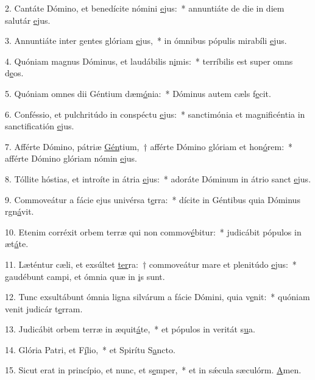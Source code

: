 2. Cantáte Dómino, et benedícite nómini \uline{e}jus:~* annuntiáte de die in diem salutár \uline{e}jus.\par 
3. Annuntiáte inter gentes glóriam \uline{e}jus,~* in ómnibus pópulis mirabíli \uline{e}jus.\par 
4. Quóniam magnus Dóminus, et laudábilis n\uline{i}mis:~* terríbilis est super omns d\uline{e}os.\par 
5. Quóniam omnes dii Géntium dæm\uline{ó}nia:~* Dóminus autem cæls f\uline{e}cit.\par 
6. Conféssio, et pulchritúdo in conspéctu \uline{e}jus:~* sanctimónia et magnificéntia in sanctificatión \uline{e}jus.\par 
7. Afférte Dómino, pátriæ \uline{Gén}tium,~† afférte Dómino glóriam et hon\uline{ó}rem:~* afférte Dómino glóriam nómin \uline{e}jus.\par 
8. Tóllite hóstias, et introíte in átria \uline{e}jus:~* adoráte Dóminum in átrio sanct \uline{e}jus.\par 
9. Commoveátur a fácie ejus univérsa t\uline{e}rra:~* dícite in Géntibus quia Dóminus rgn\uline{á}vit.\par 
10. Etenim corréxit orbem terræ qui non commov\uline{é}bitur:~* judicábit pópulos in æt\uline{á}te.\par 
11. Læténtur cæli, et exsúltet \uline{ter}ra:~† commoveátur mare et plenitúdo \uline{e}jus:~* gaudébunt campi, et ómnia quæ in \uline{i}s sunt.\par 
12. Tunc exsultábunt ómnia ligna silvárum a fácie Dómini, quia v\uline{e}nit:~* quóniam venit judicár t\uline{e}rram.\par 
13. Judicábit orbem terræ in æquit\uline{á}te,~* et pópulos in veritát s\uline{u}a.\par 
14. Glória Patri, et F\uline{í}lio,~* et Spirítu S\uline{a}ncto.\par 
15. Sicut erat in princípio, et nunc, et s\uline{e}mper,~* et in sǽcula sæculórm. \uline{A}men.\par 
